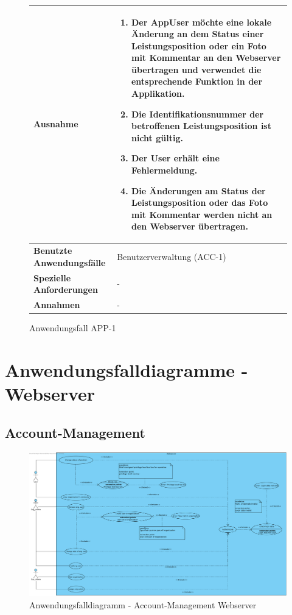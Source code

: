 			\begin{figure}[h]
	\centering
	\begin{tabularx}{\textwidth}{ X | X }
						\textbf{Ausnahme} &
				\begin{enumerate}
					 \item Der AppUser m\"ochte eine lokale \"Anderung an dem Status einer Leistungsposition oder ein Foto mit Kommentar an den Webserver \"ubertragen und verwendet die entsprechende Funktion in der Applikation. 
					 \item Die Identifikationsnummer der betroffenen Leistungsposition ist nicht g\"ultig.
					 \item Der User erh\"alt eine Fehlermeldung.
					 \item Die \"Anderungen am Status der Leistungsposition oder das Foto mit Kommentar werden nicht an den Webserver \"ubertragen.
				\end{enumerate} \\ \hline
		\textbf{Benutzte Anwendungsfälle} & Benutzerverwaltung (ACC-1) \\ \hline
		\textbf{Spezielle Anforderungen} & - \\ \hline
		\textbf{Annahmen} & -
	\end{tabularx}
	\caption{Anwendungsfall APP-1}
	\label{fig:anwendungsfall-app-tabelle-APP-1-4}
\end{figure}

\clearpage

\section{Anwendungsfalldiagramme - Webserver}

\subsection{Account-Management}

\begin{figure}[h]
	\centering
	\includegraphics[width=\linewidth]{img/diagrams/Acc_Management_Web.pdf}
	\caption{Anwendungsfalldiagramm - Account-Management Webserver}
	\label{fig:anwendungsfalldiagramm-acc}
\end{figure}

